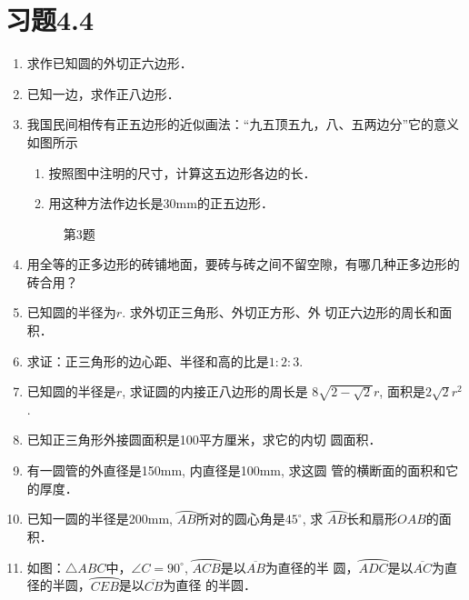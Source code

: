\section*{习题4.4}
\begin{enumerate}
    \item 求作已知圆的外切正六边形．

    \item 已知一边，求作正八边形．
    \item 我国民间相传有正五边形的近似画法：“九五顶五九，八、五两边分”它的意义如图所示
\begin{enumerate}
    \item 按照图中注明的尺寸，计算这五边形各边的长．
    \item 用这种方法作边长是30mm的正五边形．
\end{enumerate}

\begin{figure}[htp]
    \centering
    \caption*{第3题}
\end{figure}

\item 用全等的正多边形的砖铺地面，要砖与砖之间不留空隙，有哪几种正多边形的砖合用？
\item 已知圆的半径为$r$. 求外切正三角形、外切正方形、外
切正六边形的周长和面积．
\item 求证：正三角形的边心距、半径和高的比是$1:2:3$.
\item 已知圆的半径是$r$, 求证圆的内接正八边形的周长是
$8\sqrt{2-\sqrt{2}}r$, 面积是$2\sqrt{2}r^2$.
\item 已知正三角形外接圆面积是100平方厘米，求它的内切
圆面积．
\item 有一圆管的外直径是150mm, 内直径是100mm, 求这圆
管的横断面的面积和它的厚度．
\item 已知一圆的半径是200mm, $\wideparen{AB}$所对的圆心角是$45^{\circ}$, 求
$\wideparen{AB}$长和扇形$OAB$的面积．
\item 如图：$\triangle ABC$中，$\angle C=90^{\circ}$, $\wideparen{ACB}$是以$\overline{AB}$为直径的半
圆，$\wideparen{ADC}$是以$\overline{AC}$为直径的半圆，$\wideparen{CEB}$是以$\overline{CB}$为直径
的半圆．


\end{enumerate}

